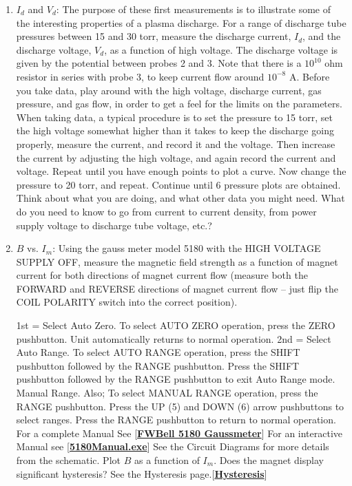 \documentclass{../lab}
\begin{document}
\begin{enumerate}
    \item $I_d$ and $V_d$: The purpose of these first measurements is to illustrate some of the interesting properties of a plasma discharge. For a range of discharge tube pressures between 15 and 30 torr, measure the discharge current, $I_d$, and the discharge voltage, $V_d $, as a function of high voltage. The discharge voltage is given by the potential between probes 2 and 3. Note that there is a $10^{10}$ ohm resistor in series with probe 3, to keep current flow around $10^{-8}$ A. Before you take data, play around with the high voltage, discharge current, gas pressure, and gas flow, in order to get a feel for the limits on the parameters. When taking data, a typical procedure is to set the pressure to 15 torr, set the high voltage somewhat higher than it takes to keep the discharge going properly, measure the current, and record it and the voltage. Then increase the current by adjusting the high voltage, and again record the current and voltage. Repeat until you have enough points to plot a curve. Now change the pressure to 20 torr, and repeat. Continue until  6 pressure plots are obtained. Think about what you are doing, and what other data you might need. What do you need to know to go from current to current density, from power supply voltage to discharge tube voltage, etc.?

    \item $B$ vs. $I_m$: Using the gauss meter model 5180 with the HIGH VOLTAGE SUPPLY OFF, measure the magnetic field strength as a function of magnet current for both directions of magnet current flow (measure both the FORWARD and REVERSE directions of magnet current flow – just flip the COIL POLARITY switch into the correct position).

    1st = Select Auto Zero. To select AUTO ZERO operation, press the ZERO pushbutton. Unit automatically returns to normal operation. 2nd = Select Auto Range. To select AUTO RANGE operation, press the SHIFT pushbutton followed by the RANGE pushbutton. Press the SHIFT pushbutton followed by the RANGE pushbutton to exit Auto Range mode. Manual Range. Also; To select MANUAL RANGE operation, press the RANGE pushbutton. Press the UP (5) and DOWN (6) arrow pushbuttons to select ranges. Press the RANGE pushbutton to return to normal operation. For a complete Manual See [\href{https://drive.google.com/file/d/1hIz7hW4KIF7obkdW_PdeqojFywvVudIo/view?usp=drive_link}{\textbf{FWBell 5180 Gaussmeter}}] For an interactive Manual see [\href{https://drive.google.com/file/d/1eWtzg8VQH2-WOXjMPfXGIpShMBBnDoRg/view?usp=drive_link}{\textbf{5180Manual.exe}}] See the Circuit Diagrams for more details from the schematic. Plot $B$ as a function of $I_m$. Does the magnet display significant hysteresis? See the Hysteresis page.[\href{https://berkeley-physics111b.github.io/appendices/hysteresis/}{\textbf{Hysteresis}}]


\end{enumerate}
\end{document}
